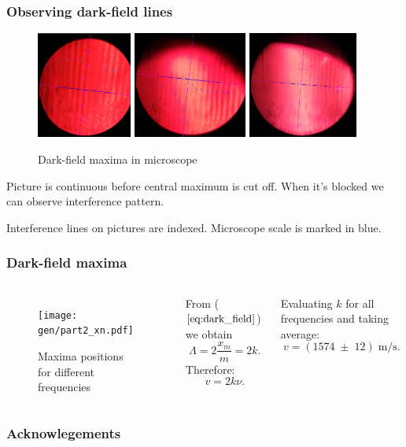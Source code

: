 \documentclass{beamer}
\begin{document}
	\begin{frame}
		\frametitle{Observing dark-field lines}
		
		\begin{figure}
			\includegraphics[height=3.5cm]{data/part2/1.jpg}
			\includegraphics[height=3.5cm]{data/part2/2.jpg}
			\includegraphics[height=3.5cm]{data/part2/3.jpg}
			\caption{Dark-field maxima in microscope}
		\end{figure}
		
		Picture is continuous before central maximum is cut off. When it's blocked we can observe interference pattern.
		
		Interference lines on pictures are indexed. Microscope scale is marked in blue.
		
	\end{frame}
	
	
	\begin{frame}
		\frametitle{Dark-field maxima}
		
		\begin{columns}
			\begin{figure}
				\texttt{[image: gen/part2\_xn.pdf]}
				\caption{Maxima positions for different frequencies}
			\end{figure}
			From ($\ref{eq:dark_field}$) we obtain
			$$\Lambda = 2 \frac{x_m}{m} = 2 k.$$
			Therefore:
			$$ v = 2 k \nu.$$
			
			
			Evaluating $k$ for all frequencies and taking average:
			$$ v = (1574 \;\pm \; 12) \; \text{m/s}. $$
			
		\end{columns}
	
		
	\end{frame}
	
	

	\begin{frame}
		\frametitle{Acknowlegements}
	\end{frame}
	
	
\end{document}
